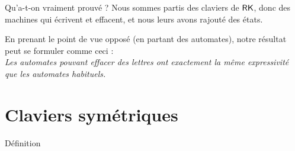 \documentclass[11pt,french]{beamer}
\begin{document}
\begin{frame}{Qu'a-t-on vraiment prouvé ?}
	Nous sommes partis des claviers de $\mathsf{RK}$, donc des machines qui écrivent et effacent, et nous leurs avons rajouté des états.
	\pause

    En prenant le point de vue opposé (en partant des automates), notre résultat peut se formuler comme ceci : \\
    \emph{Les automates pouvant effacer des lettres ont exactement la même expressivité que les automates habituels.}
\end{frame}

\section{Claviers symétriques}
\begin{frame}{Définition}
	

\end{frame}
\end{document}
